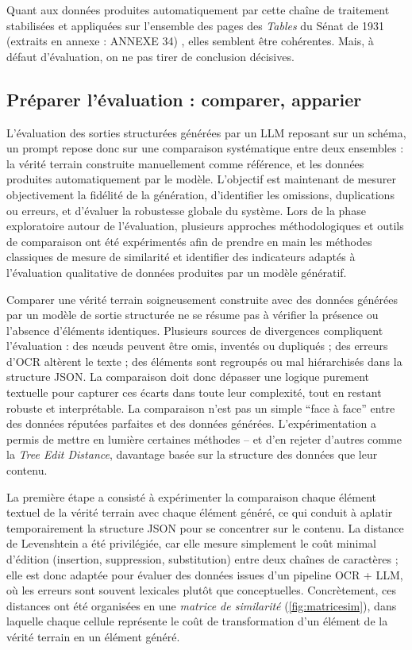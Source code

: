 Quant aux données produites automatiquement par cette chaîne de traitement stabilisées et appliquées sur l'ensemble des pages des \emph{Tables} du Sénat de 1931 (extraits en annexe : ANNEXE 34) , elles semblent être cohérentes. Mais, à défaut d'évaluation, on ne pas tirer de conclusion décisives.

\subsection{Préparer l'évaluation : comparer, apparier}

L’évaluation des sorties structurées générées par un LLM reposant sur un schéma, un prompt repose donc sur une comparaison systématique entre deux ensembles : la vérité terrain construite manuellement comme référence, et les données produites automatiquement par le modèle. L’objectif est maintenant de mesurer objectivement la fidélité de la génération, d’identifier les omissions, duplications ou erreurs, et d’évaluer la robustesse globale du système. Lors de la phase exploratoire autour de l'évaluation, plusieurs approches méthodologiques et outils de comparaison ont été expérimentés afin de prendre en main les méthodes classiques de mesure de similarité et identifier des indicateurs adaptés à l’évaluation qualitative de données produites par un modèle génératif. 

Comparer une vérité terrain soigneusement construite avec des données générées par un modèle de sortie structurée ne se résume pas à vérifier la présence ou l’absence d’éléments identiques. Plusieurs sources de divergences compliquent l’évaluation : des nœuds peuvent être omis, inventés ou dupliqués ; des erreurs d’OCR altèrent le texte ; des éléments sont regroupés ou mal hiérarchisés dans la structure JSON. La comparaison doit donc dépasser une logique purement textuelle pour capturer ces écarts dans toute leur complexité, tout en restant robuste et interprétable. La comparaison n'est pas un simple \enquote{face à face} entre des données réputées parfaites et des données générées. L'expérimentation a permis de mettre en lumière certaines méthodes -- et d'en rejeter d'autres comme la \emph{Tree Edit Distance}, davantage basée sur la structure des données que leur contenu.

La première étape a consisté à expérimenter la comparaison chaque élément textuel de la vérité terrain avec chaque élément généré, ce qui conduit à aplatir temporairement la structure JSON pour se concentrer sur le contenu. La distance de Levenshtein a été privilégiée, car elle mesure simplement le coût minimal d’édition (insertion, suppression, substitution) entre deux chaînes de caractères ; elle est donc adaptée pour évaluer des données issues d’un pipeline OCR + LLM, où les erreurs sont souvent lexicales plutôt que conceptuelles. Concrètement, ces distances ont été organisées en une \emph{matrice de similarité} (\ref{fig:matricesim}), dans laquelle chaque cellule représente le coût de transformation d’un élément de la vérité terrain en un élément généré. 

